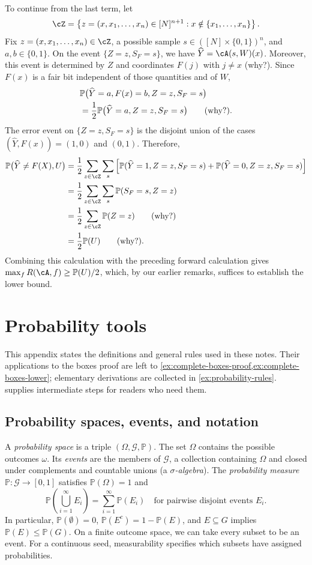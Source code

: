 \documentclass[11pt,twoside]{article}
\renewcommand{\P}{\mathbb P}
\theoremstyle{definition}
\theoremstyle{remark}
\begin{document}
To continue from the last term, let
\[
\cZ=
\left\{z=(x,x_1,\ldots,x_n)\in[N]^{n+1}:
x\notin\{x_1,\ldots,x_n\}\right\}.
\]
Fix $z=(x,x_1,\ldots,x_n)\in\cZ$, a possible sample
$s\in([N]\times\{0,1\})^n$, and $a,b\in\{0,1\}$. On the event
$\{Z=z,S_F=s\}$, we have $\widehat Y=\cA(s,W)(x)$. Moreover, this event
is determined by $Z$ and coordinates $F(j)$ with $j\ne x$ (why?). Since
$F(x)$ is a fair bit independent of those quantities and of $W$,
\begin{align}
&\P\bigl(\widehat Y=a,F(x)=b,Z=z,S_F=s\bigr)\notag\\
&\quad=\frac12\P\bigl(\widehat Y=a,Z=z,S_F=s\bigr)
\qquad\text{(why?).}
\label{eq:prediction-hidden-bit-independence}
\end{align}
The error event on $\{Z=z,S_F=s\}$ is the
disjoint union of the cases $(\widehat Y,F(x))=(1,0)$ and $(0,1)$.
Therefore,
\begin{align*}
\P\bigl(\widehat Y\ne F(X),U\bigr)
&=\frac12\sum_{z\in\cZ}
\sum_s\left[
\P(\widehat Y=1,Z=z,S_F=s)
+\P(\widehat Y=0,Z=z,S_F=s)
\right]\\
&=\frac12\sum_{z\in\cZ}\sum_s\P(S_F=s,Z=z)\\
&=\frac12\sum_{z\in\cZ}\P(Z=z)
\qquad\text{(why?)}\\
&=\frac12\P(U)
\qquad\text{(why?).}
\end{align*}
Combining this calculation with the preceding forward calculation gives
$\max_f R(\cA,f)\ge \P(U)/2$, which, by our earlier remarks, suffices to
establish the lower bound.


\section{Probability tools}
\label{app:probability}

This appendix states the definitions and general rules used in these notes.
Their applications to the boxes proof are left to
\cref{ex:complete-boxes-proof,ex:complete-boxes-lower}; elementary derivations are collected in
\cref{ex:probability-rules}.  supplies intermediate
steps for readers who need them.

\subsection{Probability spaces, events, and notation}
A \emph{probability space} is a triple $(\Omega,\mathcal G,\P)$. The set $\Omega$
contains the possible outcomes $\omega$. Its \emph{events} are the members
of $\mathcal G$, a collection containing $\Omega$ and closed under complements
and countable unions (a \emph{$\sigma$-algebra}). The \emph{probability measure}
$\P:\mathcal G\to[0,1]$ satisfies $\P(\Omega)=1$ and
\[
\P\left(\bigcup_{i=1}^{\infty}E_i\right)
=\sum_{i=1}^{\infty}\P(E_i)
\quad\text{for pairwise disjoint events }E_i.
\]
In particular, $\P(\emptyset)=0$, $\P(E^c)=1-\P(E)$, and
$E\subseteq G$ implies $\P(E)\le\P(G)$.
On a finite outcome space, we can take every subset to be an event.
For a continuous seed, measurability specifies which subsets have assigned
probabilities.
\end{document}
